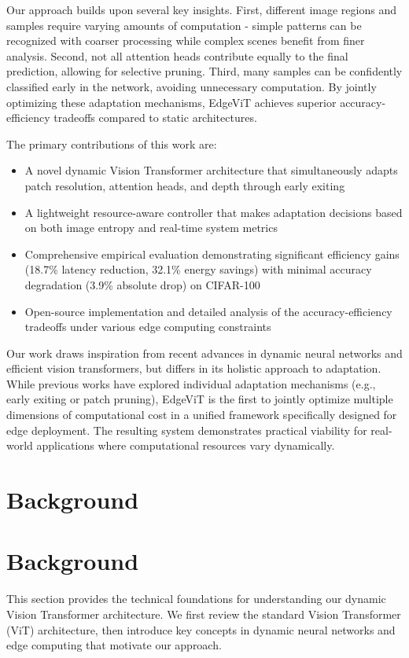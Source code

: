 \documentclass{article}
\begin{document}
Our approach builds upon several key insights. First, different image regions and samples require varying amounts of computation - simple patterns can be recognized with coarser processing while complex scenes benefit from finer analysis. Second, not all attention heads contribute equally to the final prediction, allowing for selective pruning. Third, many samples can be confidently classified early in the network, avoiding unnecessary computation. By jointly optimizing these adaptation mechanisms, EdgeViT achieves superior accuracy-efficiency tradeoffs compared to static architectures.

The primary contributions of this work are:
\begin{itemize}
    \item A novel dynamic Vision Transformer architecture that simultaneously adapts patch resolution, attention heads, and depth through early exiting
    \item A lightweight resource-aware controller that makes adaptation decisions based on both image entropy and real-time system metrics
    \item Comprehensive empirical evaluation demonstrating significant efficiency gains (18.7\% latency reduction, 32.1\% energy savings) with minimal accuracy degradation (3.9\% absolute drop) on CIFAR-100
    \item Open-source implementation and detailed analysis of the accuracy-efficiency tradeoffs under various edge computing constraints
\end{itemize}

Our work draws inspiration from recent advances in dynamic neural networks and efficient vision transformers, but differs in its holistic approach to adaptation. While previous works have explored individual adaptation mechanisms (e.g., early exiting or patch pruning), EdgeViT is the first to jointly optimize multiple dimensions of computational cost in a unified framework specifically designed for edge deployment. The resulting system demonstrates practical viability for real-world applications where computational resources vary dynamically.
\section{Background}
\section{Background}
This section provides the technical foundations for understanding our dynamic Vision Transformer architecture. We first review the standard Vision Transformer (ViT) architecture, then introduce key concepts in dynamic neural networks and edge computing that motivate our approach.
\end{document}
